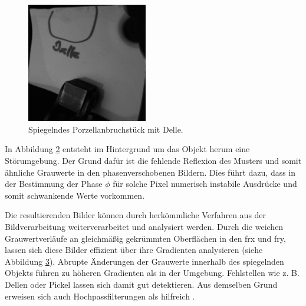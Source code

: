 {
	\begin{figure}[H]
		\centering
		\includegraphics[width = 0.47\textwidth]{04_deflektometrischeRegistrierung/auswertungDeflektometrischeRegistrierung/figures/delleBeleuchtet}
		\caption[Spiegelndes Porzellanbruchstück mit Delle]{Spiegelndes Porzellanbruchstück mit Delle.}
		\label{img:objektMitDelle}
	\end{figure}
}

{
	\begin{figure}[H]
		\centering
		
		\label{tikz:abbRegistrierungDelle}
	\end{figure}
}

\noindent
In Abbildung \ref{tikz:abbRegistrierungDelle} entsteht im Hintergrund um das Objekt herum eine Störumgebung.
Der Grund dafür ist die fehlende Reflexion des Musters und somit ähnliche Grauwerte in den phasenverschobenen Bildern.
Dies führt dazu, dass in der Bestimmung der Phase $\phi$ für solche Pixel numerisch instabile Ausdrücke und somit schwankende Werte vorkommen.

\p
Die resultierenden Bilder können durch herkömmliche Verfahren aus der Bildverarbeitung weiterverarbeitet und analysiert werden.
Durch die weichen Grauwertverläufe an gleichmäßig gekrümmten Oberflächen in den \acrshort{frx} und \acrshort{fry}, lassen sich diese Bilder effizient über ihre Gradienten analysieren (siehe Abbildung \ref{tikz:abbGradientenbildReg}).
Abrupte Änderungen der Grauwerte innerhalb des spiegelnden Objekts führen zu höheren Gradienten als in der Umgebung. Fehlstellen wie z. B. Dellen oder Pickel lassen sich damit gut detektieren.
Aus demselben Grund erweisen sich auch Hochpassfilterungen als hilfreich \cite{kit_werling}.

{
	\begin{figure}[H]
		\centering
		
		\label{tikz:abbGradientenbildReg}
	\end{figure}
}

